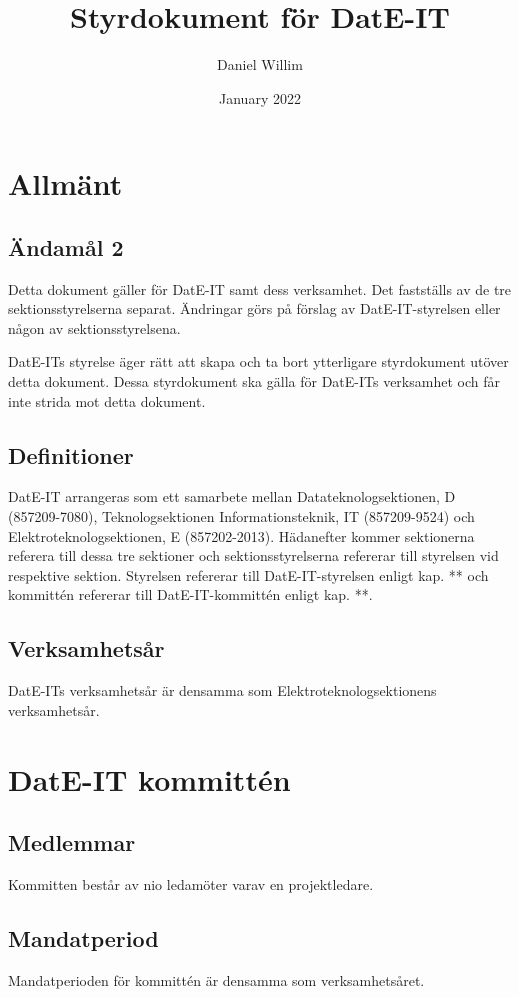 \documentclass{article}
\title{Styrdokument för DatE-IT}
\author{Daniel Willim}
\date{January 2022}
\begin{document}
\maketitle

\section{Allmänt}
\subsection{Ändamål 2}
Detta dokument gäller för DatE-IT samt dess verksamhet. Det fastställs av de tre sektionsstyrelserna separat. Ändringar görs på förslag av DatE-IT-styrelsen eller någon av sektionsstyrelsena.

DatE-ITs styrelse äger rätt att skapa och ta bort ytterligare styrdokument utöver detta dokument. Dessa styrdokument ska gälla för DatE-ITs verksamhet och får inte strida mot detta dokument.

\subsection{Definitioner}
DatE-IT arrangeras som ett samarbete mellan Datateknologsektionen, D (857209-7080), Teknologsektionen Informationsteknik, IT (857209-9524) och Elektroteknologsektionen, E (857202-2013). Hädanefter kommer sektionerna referera till dessa tre sektioner och sektionsstyrelserna refererar till styrelsen vid respektive sektion.
Styrelsen refererar till DatE-IT-styrelsen enligt kap. ** och kommittén refererar till DatE-IT-kommittén enligt kap. **.

\subsection{Verksamhetsår}
DatE-ITs verksamhetsår är densamma som Elektroteknologsektionens verksamhetsår.

\section{DatE-IT kommittén}
\subsection{Medlemmar}
Kommitten består av nio ledamöter varav en projektledare.

\subsection{Mandatperiod}
Mandatperioden för kommittén är densamma som verksamhetsåret.
\end{document}
